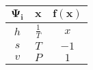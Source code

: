 \begin{tabular}{|c c c |}
    \hline
    \rowcolor{bluepoli!40} %
    \(\mathbf{\Psi_i}\)& \(\mathbf{x}\) & \(\mathbf{f(x)}\) \T\B \\
    \hline \hline
    \rowcolor{white} \(h\) & \(\frac{1}{T}\) & \(x\) \T\B\\
    \rowcolor{white}\(s\) & \(T\) & \(-1\) \T\B \\
    \rowcolor{white}\(v\) & \(P\) & \(1\) \T\B\\
    \hline
\end{tabular}